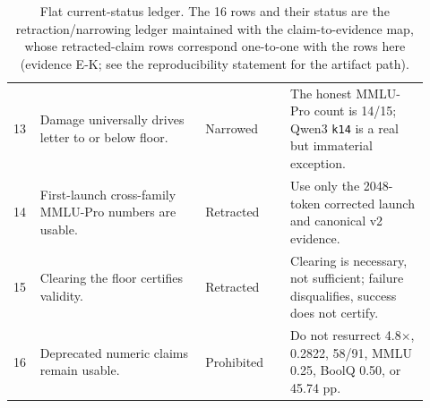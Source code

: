 \begin{table}[p]
\begin{tabular}{p{0.05\linewidth}p{0.37\linewidth}p{0.19\linewidth}p{0.31\linewidth}}
13 & Damage universally drives letter to or below floor. & Narrowed & The honest MMLU-Pro count is 14/15; Qwen3 \texttt{k14} is a real but immaterial exception. \\
14 & First-launch cross-family MMLU-Pro numbers are usable. & Retracted & Use only the 2048-token corrected launch and canonical v2 evidence. \\
15 & Clearing the floor certifies validity. & Retracted & Clearing is necessary, not sufficient; failure disqualifies, success does not certify. \\
16 & Deprecated numeric claims remain usable. & Prohibited & Do not resurrect 4.8$\times$, 0.2822, 58/91, MMLU 0.25, BoolQ 0.50, or 45.74 pp. \\
\bottomrule
\end{tabular}
\caption{Flat current-status ledger. The 16 rows and their status are the retraction/narrowing ledger maintained with the claim-to-evidence map, whose retracted-claim rows correspond one-to-one with the rows here (evidence \textsf{E-K}; see the reproducibility statement for the artifact path).}
\label{tab:claims}
\end{table}
